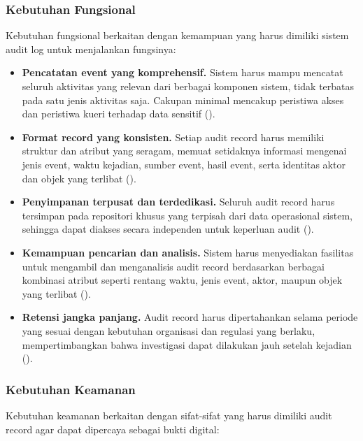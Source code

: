 \subsubsection{Kebutuhan Fungsional}

Kebutuhan fungsional berkaitan dengan kemampuan yang harus dimiliki
sistem audit log untuk menjalankan fungsinya:

\begin{itemize}
    \item \textbf{Pencatatan event yang komprehensif.} Sistem harus
    mampu mencatat seluruh aktivitas yang relevan dari berbagai
    komponen sistem, tidak terbatas pada satu jenis aktivitas saja.
    Cakupan minimal mencakup peristiwa akses dan peristiwa kueri
    terhadap data sensitif (\cite{iso27789_2021}).

    \item \textbf{Format record yang konsisten.} Setiap audit record
    harus memiliki struktur dan atribut yang seragam, memuat
    setidaknya informasi mengenai jenis event, waktu kejadian, sumber
    event, hasil event, serta identitas aktor dan objek yang terlibat
    (\cite{iso27789_2021}).

    \item \textbf{Penyimpanan terpusat dan terdedikasi.} Seluruh
    audit record harus tersimpan pada repositori khusus yang terpisah
    dari data operasional sistem, sehingga dapat diakses secara
    independen untuk keperluan audit (\cite{iso27789_2021}).

    \item \textbf{Kemampuan pencarian dan analisis.} Sistem harus
    menyediakan fasilitas untuk mengambil dan menganalisis audit record
    berdasarkan berbagai kombinasi atribut seperti rentang waktu, jenis
    event, aktor, maupun objek yang terlibat (\cite{iso27789_2021}).

    \item \textbf{Retensi jangka panjang.} Audit record harus
    dipertahankan selama periode yang sesuai dengan kebutuhan organisasi
    dan regulasi yang berlaku, mempertimbangkan bahwa investigasi dapat
    dilakukan jauh setelah kejadian (\cite{iso27789_2021}).
\end{itemize}

\subsubsection{Kebutuhan Keamanan}

Kebutuhan keamanan berkaitan dengan sifat-sifat yang harus dimiliki
audit record agar dapat dipercaya sebagai bukti digital:

